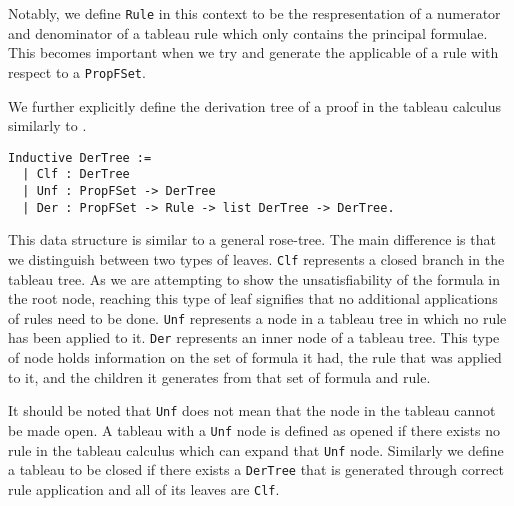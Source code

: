 \documentclass{llncs}
\begin{document}
Notably, we define \verb+Rule+ in this context to be the respresentation of a
numerator and denominator of a tableau rule which only contains the principal
formulae. This becomes important when we try and generate the applicable of a
rule with respect to a \verb+PropFSet+.

We further explicitly define the derivation tree of a proof in the tableau
calculus similarly to \cite{dawson2003new}.
%
\begin{verbatim}
Inductive DerTree :=
  | Clf : DerTree
  | Unf : PropFSet -> DerTree
  | Der : PropFSet -> Rule -> list DerTree -> DerTree.
\end{verbatim}
%
This data structure is similar to a general rose-tree. The main difference is
that we distinguish between two types of leaves. \verb+Clf+ represents a closed
branch in the tableau tree. As we are attempting to show the unsatisfiability
of the formula in the root node, reaching this type of leaf signifies that no
additional applications of rules need to be done. \verb+Unf+ represents a node
in a tableau tree in which no rule has been applied to it. \verb+Der+
represents an inner node of a tableau tree. This type of node holds information
on the set of formula it had, the rule that was applied to it, and the children
it generates from that set of formula and rule.

It should be noted that \verb+Unf+ does not mean that the node in the tableau
cannot be made open. A tableau with a \verb+Unf+ node is defined as opened if
there exists no rule in the tableau calculus which can expand that \verb+Unf+
node.  Similarly we define a tableau to be closed if there exists a
\verb+DerTree+ that is generated through correct rule application and all of
its leaves are \verb+Clf+.
\end{document}
